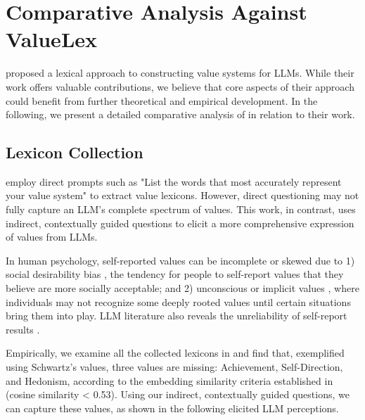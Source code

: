 \section{Comparative Analysis Against ValueLex \citep{biedma2024beyond}}

\label{app:against_bhn}

\citet{biedma2024beyond} proposed a lexical approach to constructing value systems for LLMs. While their work offers valuable contributions, we believe that core aspects of their approach could benefit from further theoretical and empirical development. In the following, we present a detailed comparative analysis of \our{} in relation to their work.

\subsection{Lexicon Collection}

\citet{biedma2024beyond} employ direct prompts such as "List the words that most accurately represent your value system" to extract value lexicons. However, direct questioning may not fully capture an LLM's complete spectrum of values. This work, in contrast, uses indirect, contextually guided questions to elicit a more comprehensive expression of values from LLMs.

In human psychology, self-reported values can be incomplete or skewed due to 1) social desirability bias \cite{randall1993social, larson2019controlling}, the tendency for people to self-report values that they believe are more socially acceptable; and 2) unconscious or implicit values \cite{greenwald1995implicit, hofer2006congruence}, where individuals may not recognize some deeply rooted values until certain situations bring them into play. LLM literature also reveals the unreliability of self-report results \cite{dominguez2023questioning, rottger2024political, ye2025gpv}.


Empirically, we examine all the collected lexicons in \cite{biedma2024beyond} and find that, exemplified using Schwartz's values, three values are missing: Achievement, Self-Direction, and Hedonism, according to the embedding similarity criteria established in \cite{sorensen2024value} (cosine similarity < 0.53). Using our indirect, contextually guided questions, we can capture these values, as shown in the following elicited LLM perceptions.

